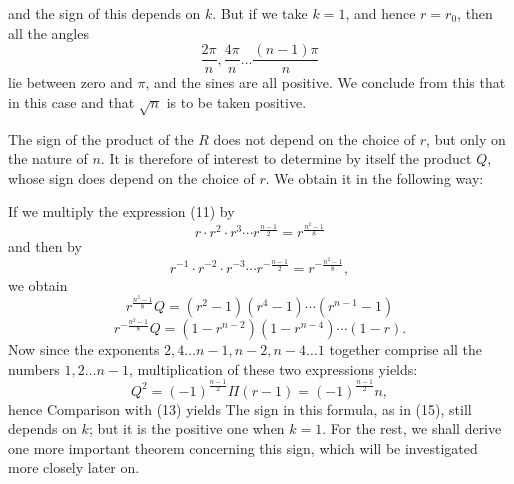 
and the sign of this depends on $k$. But if we take $k = 1$, and hence $r = r_0$, then all the angles
\[
\frac{2\pi}{n}, \frac{4\pi}{n} \ldots \frac{(n-1)\pi}{n}
\]
lie between zero and $\pi$, and the sines are all positive. We conclude from this that in this case
and that $\sqrt{n}$ is to be taken positive.

The sign of the product of the $R$ does not depend on the choice of $r$, but only on the nature of $n$. It is therefore of interest to determine by itself the product $Q$, whose sign does depend on the choice of $r$. We obtain it in the following way:

If we multiply the expression (11) by
\[
r \cdot r^2 \cdot r^3 \cdots r^{\frac{n-1}{2}} = r^{\frac{n^2-1}{8}}
\]
and then by
\[
r^{-1} \cdot r^{-2} \cdot r^{-3} \cdots r^{-\frac{n-1}{2}} = r^{-\frac{n^2-1}{8}},
\]
we obtain
\[
r^{\frac{n^2-1}{8}} Q = (r^2 - 1)(r^4 - 1) \cdots (r^{n-1} - 1)
\]
\[
r^{-\frac{n^2-1}{8}} Q = (1 - r^{n-2})(1 - r^{n-4}) \cdots (1 - r).
\]
Now since the exponents $2, 4 \ldots n-1, n-2, n-4 \ldots 1$ together comprise all the numbers $1, 2 \ldots n-1$, multiplication of these two expressions yields:
\[
Q^2 = (-1)^{\frac{n-1}{2}} \Pi(r-1) = (-1)^{\frac{n-1}{2}} n,
\]
hence
Comparison with (13) yields
The sign in this formula, as in (15), still depends on $k$; but it is the positive one when $k = 1$. For the rest, we shall derive one more important theorem concerning this sign, which will be investigated more closely later on.
